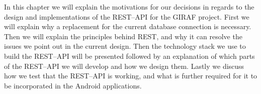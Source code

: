 In this chapter we will explain the motivations for our decisions in regards to the design and implementations of the REST--API for the GIRAF project.
First we will explain why a replacement for the current database connection is necessary.
Then we will explain the principles behind REST, and why it can resolve the issues we point out in the current design.
Then the technology stack we use to build the REST--API will be presented followed by an explanation of which parts of the REST--API we will develop and how we design them.
Lastly we discuss how we test that the REST--API is working, and what is further required for it to be incorporated in the Android applications.